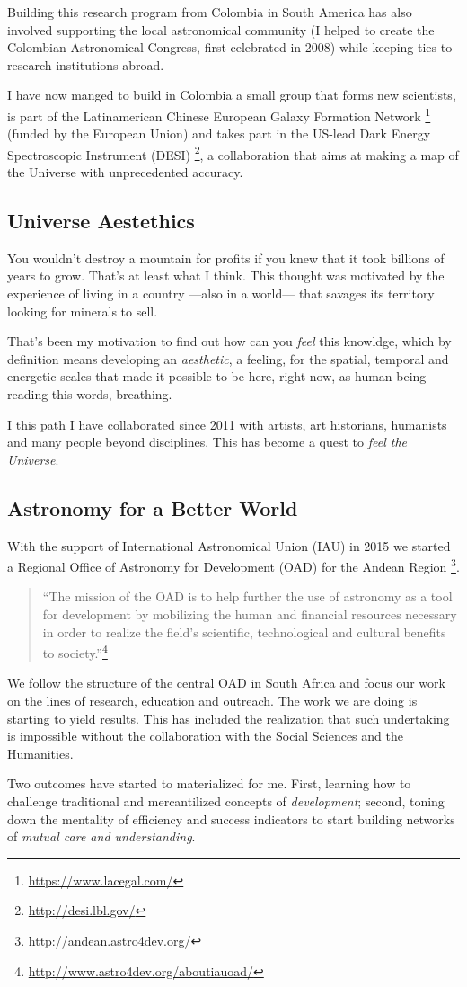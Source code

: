 \documentclass[a4paper,10pt]{article} %
\begin{document}
Building this research program from Colombia in South America has also
involved supporting the local astronomical community (I helped to
create the Colombian Astronomical Congress, first celebrated in 2008)
while keeping ties to research institutions abroad.

I have now manged to build in Colombia a small group that forms new
scientists, is part of the Latinamerican Chinese European Galaxy Formation
Network \footnote{\url{https://www.lacegal.com/}} (funded by the
European Union)  and takes part in the US-lead Dark Energy Spectroscopic Instrument
(DESI) \footnote{\url{http://desi.lbl.gov/}}, a collaboration that
aims at making a map of the Universe with unprecedented accuracy. 


\subsection{Universe Aestethics}

You wouldn't destroy a mountain for profits if you knew that
it took billions of years to grow. That's at least what I think. This
thought was motivated by the experience of living in a country ---also
in a world--- that savages its territory looking for minerals to
sell. 

That's been my motivation to find out how can you \emph{feel} this knowldge,
which by definition means developing an \emph{aesthetic}, a feeling,
for the spatial, temporal and energetic scales that made it possible
to be here, right now, as human being reading this words, breathing.

I this path I have collaborated since 2011 with artists, art historians,
humanists and many people beyond disciplines.
This has become a quest to \emph{feel the Universe}.

\subsection{Astronomy for a Better World}

With the support of International Astronomical Union (IAU)
in 2015 we started a Regional Office of Astronomy for
Development (OAD) for the Andean Region \footnote{\url{http://andean.astro4dev.org/}}.
\begin{quote}
``The mission of the OAD is to help further the use of astronomy as a
tool for development by mobilizing the human and financial resources
necessary in order to realize the field’s scientific, technological
and cultural benefits to society.''\footnote{\url{http://www.astro4dev.org/aboutiauoad/}} 
\end{quote}
We follow the structure of the central OAD in South Africa and focus
our work on the lines of research, education and outreach. 
The work we are doing is starting to yield results. 
This has included the realization that such undertaking is impossible
without the collaboration with the Social Sciences and the Humanities.

Two outcomes have started to materialized for me.
First, learning how to challenge traditional and mercantilized concepts of
\emph{development}; second, toning down the mentality of efficiency and
success indicators to start building networks of \emph{mutual care and
understanding}.  
\end{document}
